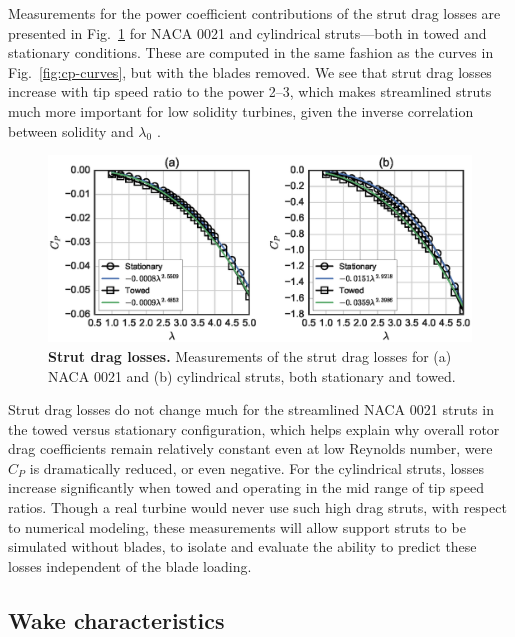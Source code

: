 \documentclass[10pt,letterpaper]{article}
\begin{document}
Measurements for the power coefficient contributions of the strut drag losses
are presented in Fig.~\ref{fig:no-blades} for NACA 0021 and cylindrical
struts---both in towed and stationary conditions. These are computed in the same
fashion as the curves in Fig.~\ref{fig:cp-curves}, but with the blades removed.
We see that strut drag losses increase with tip speed ratio to the power 2--3,
which makes streamlined struts much more important for low solidity turbines,
given the inverse correlation between solidity and $\lambda_0$
\cite{Templin1974}.

\begin{figure}[ht!]
    \includegraphics[width=\textwidth]{figures/no_blades_all.eps}
    
    \caption{{\bf Strut drag losses.} Measurements of the strut drag losses for
        (a) NACA 0021 and (b) cylindrical struts, both stationary and towed.}
    
    \label{fig:no-blades}
\end{figure}

Strut drag losses do not change much for the streamlined NACA 0021 struts in the
towed versus stationary configuration, which helps explain why overall rotor
drag coefficients remain relatively constant even at low Reynolds number, were
$C_P$ is dramatically reduced, or even negative. For the cylindrical struts,
losses increase significantly when towed and operating in the mid range of tip
speed ratios. Though a real turbine would never use such high drag struts, with
respect to numerical modeling, these measurements will allow support struts to
be simulated without blades, to isolate and evaluate the ability to predict
these losses independent of the blade loading.


\subsection*{Wake characteristics}
\end{document}
